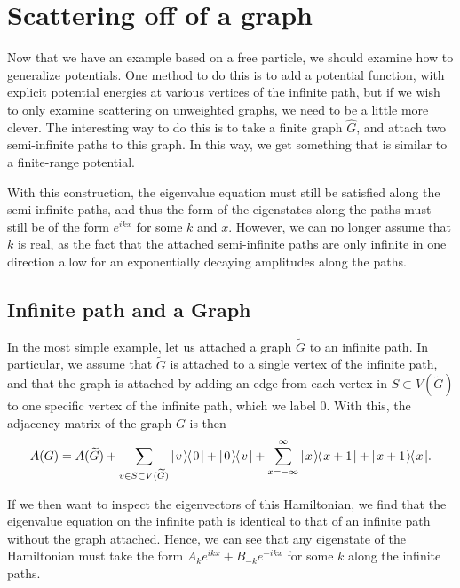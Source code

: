 \documentclass[../thesis-main/thesis-main]{subfiles}
\begin{document}
\section{Scattering off of a graph}

Now that we have an example based on a free particle, we should examine how to generalize potentials.  One method to do this is to add a potential function, with explicit potential energies at various vertices of the infinite path, but if we wish to only examine scattering on unweighted graphs, we need to be a little more clever.  The interesting way to do this is to take a finite graph $\hat{G}$, and attach two semi-infinite paths to this graph.  In this way, we get something that is similar to a finite-range potential.

With this construction, the eigenvalue equation must still be satisfied along the semi-infinite paths, and thus the form of the eigenstates along the paths must still be of the form $e^{i k x}$ for some $k$ and $x$.  However, we can no longer assume that $k$ is real, as the fact that the attached semi-infinite paths are only infinite in one direction allow for an exponentially decaying amplitudes along the paths.


\subsection{Infinite path and a Graph}

In the most simple example, let us attached a graph $\widetilde{G}$ to an infinite path.  In particular, we assume that $\widetilde{G}$ is attached to a single vertex of the infinite path, and that the graph is attached by adding an edge from each vertex in $S\subset V(\widetilde{G})$ to one specific vertex of the infinite path, which we label $0$.  With this, the adjacency matrix of the graph $G$ is then
\begin{equation}
  A(G) = A(\widetilde{G}) + \sum_{v\in S \subset V(\widetilde{G})} |\mspace{2mu} v \mspace{2mu} \rangle\mspace{-2mu}\langle\mspace{2mu} 0 \mspace{2mu} | + |\mspace{2mu} 0 \mspace{2mu} \rangle\mspace{-2mu}\langle\mspace{2mu} v \mspace{2mu} | + \sum_{x=-\infty}^\infty |\mspace{2mu} x \mspace{2mu} \rangle\mspace{-2mu}\langle\mspace{2mu} x+1 \mspace{2mu} | + |\mspace{2mu} x+1 \mspace{2mu} \rangle\mspace{-2mu}\langle\mspace{2mu} x \mspace{2mu} |.
\end{equation}

If we then want to inspect the eigenvectors of this Hamiltonian, we find that the eigenvalue equation on the infinite path is identical to that of an infinite path without the graph attached.  Hence, we can see that any eigenstate of the Hamiltonian must take the form $A_ke^{i k x} + B_{-k}e^{-i k x}$ for some $k$ along the infinite paths.  
\end{document}
